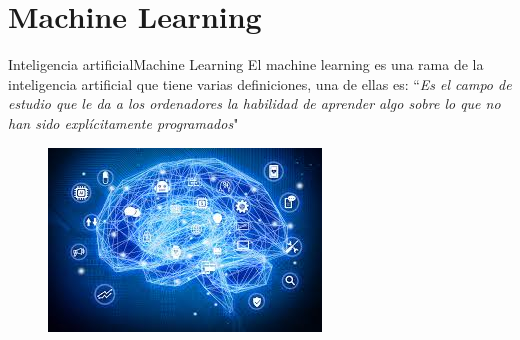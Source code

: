 \documentclass[10pt,xcolor={dvipsnames}]{beamer}
\begin{document}
\section{Machine Learning}

\begin{frame}{Inteligencia artificial}{Machine Learning}
El machine learning es una rama de la inteligencia artificial que tiene varias definiciones, una de ellas es: ``\textit{Es el campo de estudio que le da a los ordenadores la habilidad de aprender algo sobre lo que no han sido explícitamente programados}"
	\begin{figure}[ht]
	\includegraphics[scale=0.2,width=0.5\linewidth]{img/ML}
\end{figure}
\end{frame}
\end{document}
